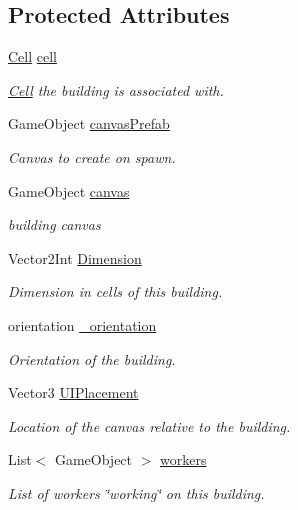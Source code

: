 \subsection*{Protected Attributes}
\begin{DoxyCompactItemize}
\item 
\mbox{\hyperlink{class_cell}{Cell}} \mbox{\hyperlink{class_building_ae4542c15fe24dd9499c72b16cb329492}{cell}}
\begin{DoxyCompactList}\small\item\em \mbox{\hyperlink{class_cell}{Cell}} the building is associated with. \end{DoxyCompactList}\item 
Game\+Object \mbox{\hyperlink{class_building_a8a0f028fd434f39eec8a5d3f5f6df82d}{canvas\+Prefab}}
\begin{DoxyCompactList}\small\item\em Canvas to create on spawn. \end{DoxyCompactList}\item 
Game\+Object \mbox{\hyperlink{class_building_a404053cc6bb26179c3ffacba529323ab}{canvas}}
\begin{DoxyCompactList}\small\item\em building canvas \end{DoxyCompactList}\item 
Vector2\+Int \mbox{\hyperlink{class_building_a5fce85810caa468c10e4c13f6ae0d7f2}{Dimension}}
\begin{DoxyCompactList}\small\item\em Dimension in cells of this building. \end{DoxyCompactList}\item 
orientation \mbox{\hyperlink{class_building_af17fc4832a9e36f5ea3891f486138fc6}{\+\_\+orientation}}
\begin{DoxyCompactList}\small\item\em Orientation of the building. \end{DoxyCompactList}\item 
Vector3 \mbox{\hyperlink{class_building_a694eaef4268e25024f43389db9527dde}{U\+I\+Placement}}
\begin{DoxyCompactList}\small\item\em Location of the canvas relative to the building. \end{DoxyCompactList}\item 
List$<$ Game\+Object $>$ \mbox{\hyperlink{class_building_a0058fcade6af241bbb53527ca3b030af}{workers}}
\begin{DoxyCompactList}\small\item\em List of workers \char`\"{}working\char`\"{} on this building. \end{DoxyCompactList}\item 

\end{DoxyCompactItemize}
